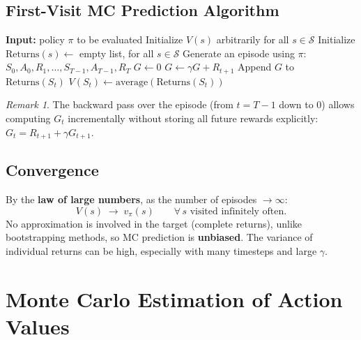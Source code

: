 \documentclass[11pt,a4paper]{article}
\theoremstyle{definition}
\theoremstyle{plain}
\theoremstyle{remark}
\newtheorem*{remark}{Remark}
\begin{document}
\subsection{First-Visit MC Prediction Algorithm}

\begin{algorithm}
\caption{First-Visit MC Prediction, estimating $V \approx v_\pi$}
\begin{algorithmic}
\STATE \textbf{Input:} policy $\pi$ to be evaluated
\STATE Initialize $V(s)$ arbitrarily for all $s \in \mathcal{S}$
\STATE Initialize $\text{Returns}(s) \leftarrow$ empty list, for all $s \in \mathcal{S}$
\LOOP
    \STATE Generate an episode using $\pi$: $S_0, A_0, R_1, \ldots, S_{T-1}, A_{T-1}, R_T$
    \STATE $G \leftarrow 0$
        \STATE $G \leftarrow \gamma G + R_{t+1}$
            \STATE Append $G$ to $\text{Returns}(S_t)$
            \STATE $V(S_t) \leftarrow \text{average}(\text{Returns}(S_t))$
        \ENDIF
    \ENDFOR
\ENDLOOP
\end{algorithmic}
\end{algorithm}

\begin{remark}
The backward pass over the episode (from $t = T-1$ down to $0$) allows computing $G_t$ incrementally without storing all future rewards explicitly: $G_t = R_{t+1} + \gamma G_{t+1}$.
\end{remark}

\subsection{Convergence}

By the \textbf{law of large numbers}, as the number of episodes $\to \infty$:
\[
    V(s) \;\to\; v_\pi(s) \qquad \forall\, s \text{ visited infinitely often.}
\]
No approximation is involved in the target (complete returns), unlike bootstrapping methods, so MC prediction is \textbf{unbiased}. The variance of individual returns can be high, especially with many timesteps and large $\gamma$.

\section{Monte Carlo Estimation of Action Values}
\end{document}

